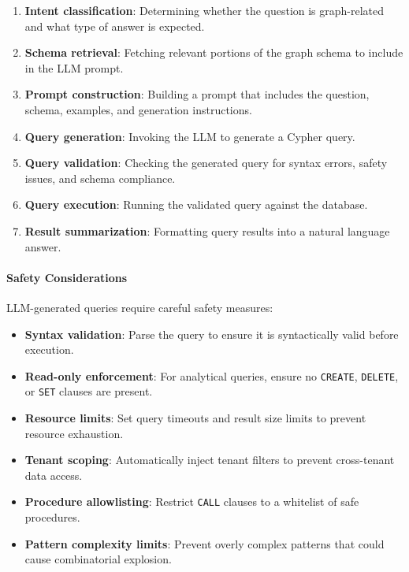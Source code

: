\documentclass[a4paper,twoside]{sapthesis}
\begin{document}
\begin{enumerate}
    \item \textbf{Intent classification}: Determining whether the question is graph-related and what type of answer is expected.
    
    \item \textbf{Schema retrieval}: Fetching relevant portions of the graph schema to include in the LLM prompt.
    
    \item \textbf{Prompt construction}: Building a prompt that includes the question, schema, examples, and generation instructions.
    
    \item \textbf{Query generation}: Invoking the LLM to generate a Cypher query.
    
    \item \textbf{Query validation}: Checking the generated query for syntax errors, safety issues, and schema compliance.
    
    \item \textbf{Query execution}: Running the validated query against the database.
    
    \item \textbf{Result summarization}: Formatting query results into a natural language answer.
\end{enumerate}

\paragraph{Safety Considerations}

LLM-generated queries require careful safety measures:

\begin{itemize}
    \item \textbf{Syntax validation}: Parse the query to ensure it is syntactically valid before execution.
    
    \item \textbf{Read-only enforcement}: For analytical queries, ensure no \texttt{CREATE}, \texttt{DELETE}, or \texttt{SET} clauses are present.
    
    \item \textbf{Resource limits}: Set query timeouts and result size limits to prevent resource exhaustion.
    
    \item \textbf{Tenant scoping}: Automatically inject tenant filters to prevent cross-tenant data access.
    
    \item \textbf{Procedure allowlisting}: Restrict \texttt{CALL} clauses to a whitelist of safe procedures.
    
    \item \textbf{Pattern complexity limits}: Prevent overly complex patterns that could cause combinatorial explosion.
\end{itemize}
\end{document}
